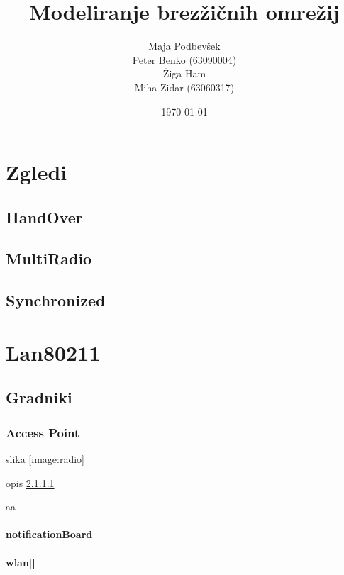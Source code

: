 \documentclass[a4paper,11pt]{article}
\title{Modeliranje brez\v{z}i\v{c}nih omre\v{z}ij}
\author{
    Maja Podbevšek\\
    Peter Benko (63090004)\\
    \v{Z}iga Ham\\
    Miha Zidar (63060317)
}
\date{\today}
\begin{document}
\maketitle

\pagebreak

\tableofcontents

\pagebreak

\section{Zgledi}

\subsection{HandOver}

\subsection{MultiRadio}

\subsection{Synchronized}


\section{Lan80211}



\subsection{Gradniki}

\subsubsection{Access Point}
\label{description:acceesspoint}

slika \ref{image:radio}

opis \ref{description:notificationBoard}

aa

\paragraph{notificationBoard}
\label{description:notificationBoard}

\paragraph{wlan[]}
\label{description:wlan}
\end{document}
